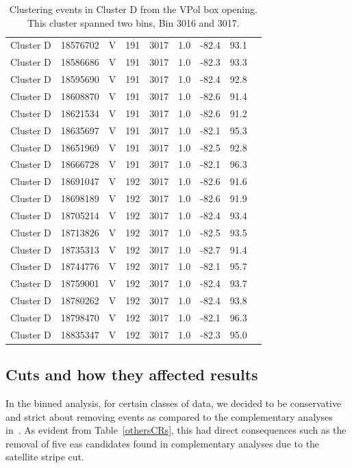 \begin{table}
\begin{tabular}{ |c|c|c|c|c|c|c|c|c| }
Cluster D &	18576702 & V & 191 & 3017 & 1.0 & -82.4 & 93.1\\ 
Cluster D &	18586686 & V & 191 & 3017 & 1.0 & -82.3 & 93.3\\ 
Cluster D &	18595690 & V & 191 & 3017 & 1.0 & -82.4 & 92.8\\ 
Cluster D &	18608870 & V & 191 & 3017 & 1.0 & -82.6 & 91.4\\
Cluster D &	18621534 & V & 191 & 3017 & 1.0 & -82.6 & 91.2\\ 
Cluster D &	18635697 & V & 191 & 3017 & 1.0 & -82.1 & 95.3\\ 
Cluster D &	18651969 & V & 191 & 3017 & 1.0 & -82.5 & 92.8\\ 
Cluster D &	18666728 & V & 191 & 3017 & 1.0 & -82.1 & 96.3\\ 
Cluster D &	18691047 & V & 192 & 3017 & 1.0 & -82.6 & 91.6\\ 
Cluster D &	18698189 & V & 192 & 3017 & 1.0 & -82.6 & 91.9\\ 
Cluster D &	18705214 & V & 192 & 3017 & 1.0 & -82.4 & 93.4\\ 
Cluster D &	18713826 & V & 192 & 3017 & 1.0 & -82.5 & 93.5\\ 
Cluster D &	18735313 & V & 192 & 3017 & 1.0 & -82.7 & 91.4\\ 
Cluster D &	18744776 & V & 192 & 3017 & 1.0 & -82.1 & 95.7\\ 
Cluster D &	18759001 & V & 192 & 3017 & 1.0 & -82.4 & 93.7\\ 
Cluster D &	18780262 & V & 192 & 3017 & 1.0 & -82.4 & 93.8\\ 
Cluster D &	18798470 & V & 192 & 3017 & 1.0 & -82.1 & 96.3\\ 
Cluster D &	18835347 & V & 192 & 3017 & 1.0 & -82.3 & 95.0\\ 
\hline
\end{tabular}
\caption{Clustering events in Cluster D from the VPol box opening. This cluster spanned two bins, Bin 3016 and 3017.}
\label{vpol_cluster_d}
\end{table}


\subsection{Cuts and how they affected results}
\label{conservative}

In the binned analysis, for certain classes of data, we decided to be conservative and strict about removing events as compared to the complementary analyses in~\cite{diffuse}. As evident from Table~\ref{othersCRs}, this had direct consequences such as the removal of five \gls{eas} candidates found in complementary analyses due to the satellite stripe cut. 


